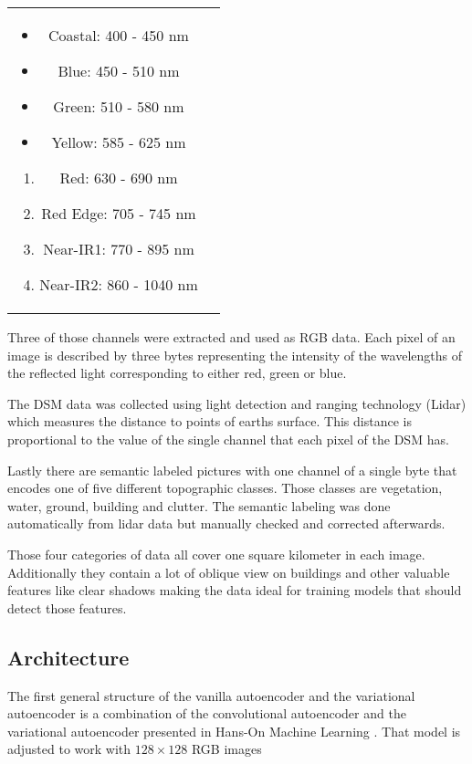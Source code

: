 \begin{tabular} {c c}
    \parbox{5cm}{
        \begin{itemize}
            \item Coastal: 400 - 450 nm 			
            \item Blue: 450 - 510 nm			
            \item Green: 510 - 580 nm 			
            \item Yellow: 585 - 625 nm
        \end{itemize}
    }
    \parbox{5cm}{
        \begin{enumerate} 			
            \item Red: 630 - 690 nm
            \item Red Edge: 705 - 745 nm
            \item Near-IR1: 770 - 895 nm
            \item Near-IR2: 860 - 1040 nm
        \end{enumerate}
    }
\end{tabular}
\bigskip

Three of those channels were extracted and used as RGB data. 
Each pixel of an image is described by three bytes representing the intensity of the wavelengths of the 
reflected light corresponding to either red, green or blue.

The DSM data was collected using light detection and ranging technology (Lidar) which measures the 
distance to points of earths surface. This distance is proportional to the value of the single channel
that each pixel of the DSM has.

Lastly there are semantic labeled pictures with one channel of a single byte that encodes one of five 
different topographic classes. Those classes are vegetation, water, ground, building and clutter. 
The semantic labeling was done automatically from lidar data but manually checked and corrected afterwards.

Those four categories of data all cover one square kilometer in each image.
Additionally they contain a lot of oblique view on buildings and other valuable
features like clear shadows making the data ideal for training models that should 
detect those features.



\subsection{Architecture}

The first general structure of the vanilla autoencoder and the variational autoencoder is a combination 
of the convolutional autoencoder and the variational autoencoder presented in Hans-On Machine Learning
\parencite{2019-geron-homl}. That model is adjusted to work with $128\times 128$ RGB images

